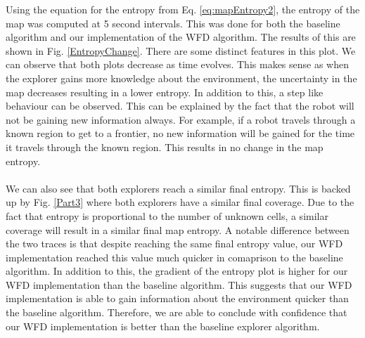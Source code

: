 \documentclass[a4paper,12pt]{article}
\begin{document}
			Using the equation for the entropy from Eq. \ref{eq:mapEntropy2}, the entropy of the map was computed at 5 second intervals. This was done for both the baseline algorithm and our implementation of the WFD algorithm. The results of this are shown in Fig. \ref{EntropyChange}. There are some distinct features in this plot. We can observe that both plots decrease as time evolves. This makes sense as when the explorer gains more knowledge about the environment, the uncertainty in the map decreases resulting in a lower entropy. In addition to this, a step like behaviour can be observed. This can be explained by the fact that the robot will not be gaining new information always. For example, if a robot travels through a known region to get to a frontier, no new information will be gained for the time it travels through the known region. This results in no change in the map entropy. 
			\\
			\\
			We can also see that both explorers reach a similar final entropy. This is backed up by Fig. \ref{Part3} where both explorers have a similar final coverage. Due to the fact that entropy is proportional to the number of unknown cells, a similar coverage will result in a similar final map entropy. A notable difference between the two traces is that despite reaching the same final entropy value, our WFD implementation reached this value much quicker in comaprison to the baseline algorithm. In addition to this, the gradient of the entropy plot is higher for our WFD implementation than the baseline algorithm. This suggests that our WFD implementation is able to gain information about the environment quicker than the baseline algorithm. Therefore, we are able to conclude with confidence that our WFD implementation is better than the baseline explorer algorithm. 
	
	
	

	
\end{document}
